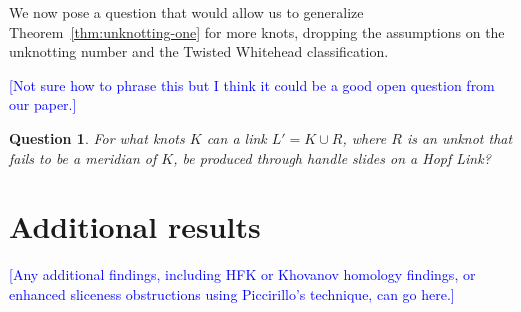 \documentclass[11pt,usenames,dvipsnames,reqno]{amsart}
\numberwithin{theorem}{section}
\newtheorem{question}[theorem]{Question}
\theoremstyle{ex}
\theoremstyle{rem}
\def\kh#1{\textcolor{Blue}{#1}}
\begin{document}
We now pose a question that would allow us to generalize Theorem~\ref{thm:unknotting-one} for more knots, dropping the assumptions on the unknotting number and the Twisted Whitehead classification.

\kh{[Not sure how to phrase this but I think it could be a good open question from our paper.]}
\begin{question}
	For what knots $K$ can a link $L' = K \cup R$, where $R$ is an unknot that fails to be a meridian of $K$, be produced through handle slides on a Hopf Link?
\end{question}

\section{Additional results}

\kh{[Any additional findings, including HFK or Khovanov homology findings, or enhanced sliceness obstructions using Piccirillo's technique, can go here.]}




\end{document}
